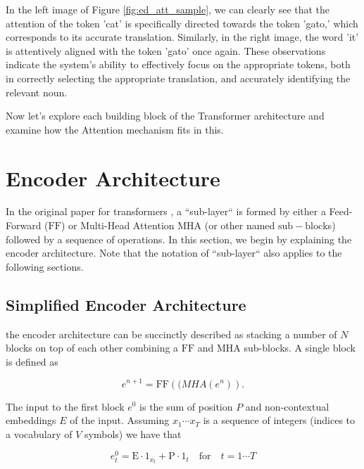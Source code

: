 In the left image of Figure \ref{fig:ed_att_sample}, we can clearly see that the attention of the token 'cat' is specifically directed towards the token 'gato,' which corresponds to its accurate translation. Similarly, in the right image, the word 'it' is attentively aligned with the token 'gato' once again. These observations indicate the system's ability to effectively focus on the appropriate tokens, both in correctly selecting the appropriate translation, and accurately identifying the relevant noun.

Now let's explore each building block of the Transformer architecture and examine how the Attention mechanism fits in this.



\section{Encoder Architecture}\label{sec:enc}

In the original paper for transformers \citep{vaswani2017attention}, a ``sub-layer`` is formed by either a Feed-Forward ($\mathrm{FF}$) or Multi-Head Attention $\mathrm{MHA}$ (or other named $\mathrm{sub-block}$s) followed by a sequence of operations. In this section, we begin by explaining the encoder architecture. Note that the notation of ``sub-layer`` also applies to the following sections.

\subsection{Simplified Encoder Architecture}

the encoder architecture can be succinctly described as stacking a number of $N$ blocks on top of each other combining a $\mathrm{FF}$ and $\mathrm{MHA}$ sub-blocks. A single block is defined as

\begin{equation}
e^{n+1} = \mathrm{FF}(\mathrm(MHA(e^n)).
\end{equation}

The input to the first block $e^0$ is the sum of position $P$ and non-contextual embeddings $E$ of the input. Assuming $x_1 \cdots x_T$ is a sequence of integers (indices to a vocabulary of $V$ symbols) we have that

\begin{equation}
e^{0}_t = \mathrm{E} \cdot \mathrm{1}_{x_t} + \mathrm{P} \cdot \mathrm{1}_t \quad \mbox{for} \quad t=1 \cdots T
\end{equation}

